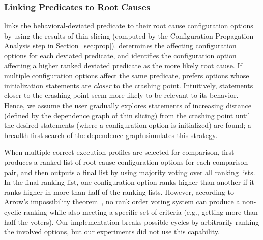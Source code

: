 \subsubsection{Linking Predicates to Root Causes}
\label{sec:linking}


\ourtool links the behavioral-deviated
predicate to their root cause configuration options
by using the results of thin slicing (computed by the Configuration Propagation
Analysis step in Section~\ref{sec:prop}).
\ourtool determines
the affecting configuration options for each deviated predicate,
and identifies the configuration option
affecting a higher ranked deviated predicate as the more likely
root cause. If multiple configuration options affect the same
predicate, \ourtool prefers options whose initialization
statements are \textit{closer} to the
crashing point. Intuitively, statements closer to the
crashing point seem more likely to be relevant to its behavior.
Hence, we assume the user gradually explores statements of
increasing distance (defined by the dependence graph of thin slicing)
from the crashing point until the desired statements (where a configuration
option is initialized) are found; a breadth-first
search of the dependence graph simulates this strategy.


When multiple correct execution profiles are selected for comparison,
\ourtool first produces a ranked list of root cause
configuration options for each comparison pair, and then outputs
a final list by using majority voting over all ranking lists.
In the final ranking list, one configuration option ranks higher
than another if it ranks higher in more than half of the ranking lists.
However, according to Arrow's impossibility theorem~\cite{Fishburn1970103},
no rank order voting system can produce a non-cyclic ranking while also
meeting a specific set of criteria (e.g., getting more than half the voters).
Our implementation breaks possible cycles by arbitrarily ranking the
involved options, but our experiments did not use this capability.



